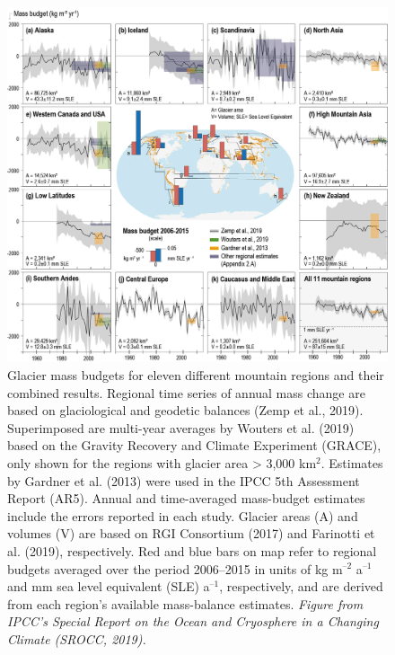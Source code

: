 \begin{figure}[h]
\centering
\includegraphics[width=14cm]{Figures/intro/Figure_1.png}
\caption{Glacier mass budgets for eleven different mountain regions and their combined results. Regional time series of annual mass change are based on glaciological and geodetic balances (Zemp et al., 2019). Superimposed are multi-year averages by Wouters et al. (2019) based on the Gravity Recovery and Climate Experiment (GRACE), only shown for the regions with glacier area > 3,000 km$^{2}$. Estimates by Gardner et al. (2013) were used in the IPCC 5th Assessment Report (AR5). Annual and time-averaged mass-budget estimates include the errors reported in each study. Glacier areas (A) and volumes (V) are based on RGI Consortium (2017)
and Farinotti et al. (2019), respectively. Red and blue bars on map refer to regional budgets averaged over the period 2006–2015 in units of kg m$^{–2}$ a$^{–1}$ and mm sea level equivalent (SLE) a$^{–1}$, respectively, and are derived from each region's available mass-balance estimates. \textit{Figure from IPCC's Special Report on the Ocean and Cryosphere in a Changing Climate (SROCC, 2019).}} 
\label{intro:fig1}
\end{figure}


